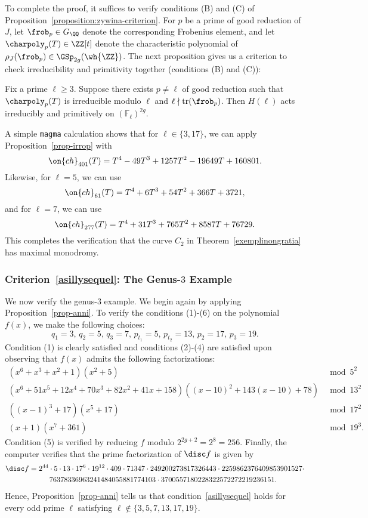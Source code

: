 To complete the proof, it suffices to verify conditions (B) and (C) of Proposition~\ref{proposition:zywina-criterion}.
For $p$ be a prime of good reduction of $J$, let $\frob_p \in G_{\QQ}$ denote the corresponding Frobenius element, and let $\charpoly_p(T) \in \ZZ[t]$ denote the characteristic polynomial of $\rho_J(\frob_p) \in \GSp_{2g}(\wh{\ZZ})$. The next proposition gives us a criterion to check irreducibility and primitivity together (conditions (B) and (C)):

\begin{proposition}\label{prop-irrop}
	Fix a prime $\ell \ge 3$. Suppose there exists $p \neq \ell$ of good reduction such that $\charpoly_p(T)$ is irreducible modulo $\ell$ and $\ell \nmid \operatorname{tr}(\frob_p)$. Then $H(\ell)$ acts irreducibly and primitively on $(\mathbb{F}_\ell)^{2g}$. 
\end{proposition}

A simple {\tt magma} calculation shows that for $\ell \in \{3,17\}$, we can apply Proposition~\ref{prop-irrop} with
$$\on{ch}_{401}(T) = T^4 - 49T^3+1257T^2-19649T+160801.$$
Likewise, for $\ell = 5$, we can use 
$$\on{ch}_{61}(T) = T^4 + 6T^3 + 54T^2 + 366T + 3721,$$
and for $\ell = 7$, we can use
$$\on{ch}_{277}(T) = T^4 + 31T^3 + 765T^2 + 8587T + 76729.$$
This completes the verification that the curve $C_2$ in Theorem~\ref{exemplinongratia} has maximal monodromy.

\subsubsection{Criterion~\eqref{asillysequel}: The Genus-$3$ Example}

We now verify the genus-$3$ example. We begin again by applying Proposition~\ref{prop-anni}. To verify the conditions (1)-(6) on the polynomial $f(x)$, we make the following choices:
$$q_1 = 3, \,  q_2 = 5,\, q_3 = 7,\, p_{t_1} = 5,\, p_{t_2} = 13,\, p_2 = 17,\, p_3 = 19.$$ 
Condition (1) is clearly satisfied and
conditions (2)-(4) are satisfied upon observing that $f(x)$ admits the following factorizations:
\begin{align*}
( x^6 + x^3 + x^2 + 1 )( x^2 + 5 ) & \bmod 5^2 \\
	 (x^6 + 51x^5 + 12 x^4 + 70x^3 + 82x^2 + 41x + 158)((x-10)^2 + 143(x-10)+78)  & \bmod 13^2 \\
	((x-1)^3 + 17)(x^5 + 17) & \bmod 17^2 \\
	(x+1)(x^7 + 361) & \bmod 19^3.
\end{align*}
Condition (5) is verified by reducing $f$ modulo $2^{2g+2} = 2^8 = 256$.
Finally, the computer verifies that the prime factorization of $\disc f$ is given by
\begin{align*}
	& \disc f = 2^{44} \cdot 5 \cdot 13 \cdot 17^6 \cdot 19^{12} \cdot 409 \cdot 71347 \cdot 
249200273817326443 \cdot 2259862376409853901527 \cdot \\
& \qquad \qquad 
\qquad 76378336963241484055881774103 \cdot 3700557180228322572272219236151
.
	\end{align*}
Hence, Proposition~\ref{prop-anni} tells us that condition~\eqref{asillysequel} holds for every odd prime $\ell$ satisfying $\ell \not\in \{3,5,7,13,17,19\}$.

